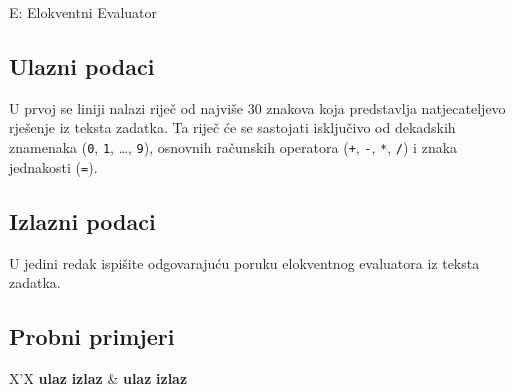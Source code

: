 \begin{statement}[
  timelimit=1 s,
  memorylimit=512 MiB,
]{E: Elokventni Evaluator}
\subsection*{Ulazni podaci}
U prvoj se liniji nalazi riječ od najviše $30$ znakova koja predstavlja
natjecateljevo rješenje iz teksta zadatka. Ta riječ će se sastojati isključivo
od dekadskih znamenaka (\texttt{0}, \texttt{1}, \dots, \texttt{9}), osnovnih
računskih operatora (\texttt{+}, \texttt{-}, \texttt{*}, \texttt{/}) i znaka
jednakosti (\texttt{=}).

\subsection*{Izlazni podaci}
U jedini redak ispišite odgovarajuću poruku elokventnog evaluatora iz
teksta zadatka.

\subsection*{Probni primjeri}
  \begin{tabularx}{\textwidth}{X'X}
  \textbf{ulaz}
  \linespread{1}{}
  \textbf{izlaz}
  \linespread{1}{} &
  \textbf{ulaz}
  \linespread{1}{}
  \textbf{izlaz}
  \linespread{1}{}
\end{tabularx}

\end{statement}

